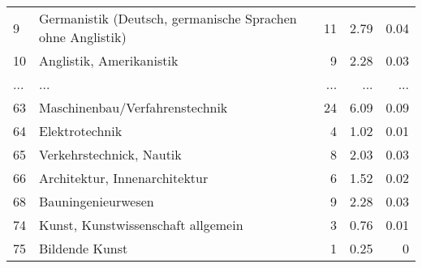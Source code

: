 \begin{longtable}{lXrrr}
        9 & \multicolumn{1}{X}{Germanistik (Deutsch, germanische Sprachen ohne Anglistik)} & %
          \num{11} &
          \num[round-mode=places,round-precision=2]{2.79} &
          \num[round-mode=places,round-precision=2]{0.04} \\
        10 & \multicolumn{1}{X}{Anglistik, Amerikanistik} & %
          \num{9} &
          \num[round-mode=places,round-precision=2]{2.28} &
          \num[round-mode=places,round-precision=2]{0.03} \\
       ... & ... & ... & ... & ... \\
        63 & \multicolumn{1}{X}{Maschinenbau/Verfahrenstechnik} & %
          \num{24} &
          \num[round-mode=places,round-precision=2]{6.09} &
          \num[round-mode=places,round-precision=2]{0.09} \\

        64 & \multicolumn{1}{X}{Elektrotechnik} & %
          \num{4} &
          \num[round-mode=places,round-precision=2]{1.02} &
          \num[round-mode=places,round-precision=2]{0.01} \\

        65 & \multicolumn{1}{X}{Verkehrstechnick, Nautik} & %
          \num{8} &
          \num[round-mode=places,round-precision=2]{2.03} &
          \num[round-mode=places,round-precision=2]{0.03} \\

        66 & \multicolumn{1}{X}{Architektur, Innenarchitektur} & %
          \num{6} &
          \num[round-mode=places,round-precision=2]{1.52} &
          \num[round-mode=places,round-precision=2]{0.02} \\

        68 & \multicolumn{1}{X}{Bauningenieurwesen} & %
          \num{9} &
          \num[round-mode=places,round-precision=2]{2.28} &
          \num[round-mode=places,round-precision=2]{0.03} \\

        74 & \multicolumn{1}{X}{Kunst, Kunstwissenschaft allgemein} & %
          \num{3} &
          \num[round-mode=places,round-precision=2]{0.76} &
          \num[round-mode=places,round-precision=2]{0.01} \\

        75 & \multicolumn{1}{X}{Bildende Kunst} & %
          \num{1} &
          \num[round-mode=places,round-precision=2]{0.25} &
          \num[round-mode=places,round-precision=2]{0} \\


\end{longtable}

